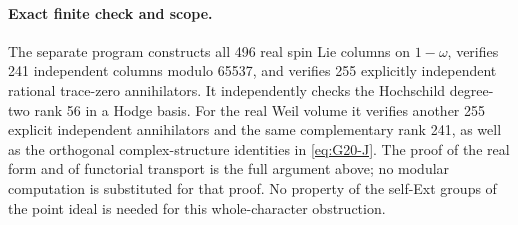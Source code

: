\paragraph{Exact finite check and scope.}
The separate program 
constructs all 496 real spin Lie columns on \(1-\omega\), verifies
241 independent columns modulo 65537, and verifies 255 explicitly
independent rational trace-zero annihilators. It independently checks
the Hochschild degree-two rank 56 in a Hodge basis. For the real Weil
volume it verifies another 255 explicit independent annihilators
and the same complementary rank 241, as well as the orthogonal
complex-structure identities in \eqref{eq:G20-J}. The proof of the
real form and of functorial transport is the full argument above;
no modular computation is substituted for that proof. No property
of the self-Ext groups of the point ideal is needed for this
whole-character obstruction.

